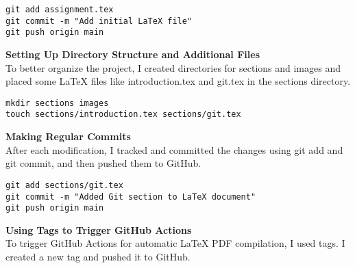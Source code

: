 \documentclass{article}
\begin{document}
\begin{verbatim}
git add assignment.tex
git commit -m "Add initial LaTeX file"
git push origin main
\end{verbatim}

\textbf{Setting Up Directory Structure and Additional Files} \\
To better organize the project, I created directories for sections and images and placed some LaTeX files like introduction.tex and git.tex in the sections directory.

\begin{verbatim}
mkdir sections images
touch sections/introduction.tex sections/git.tex
\end{verbatim}

\textbf{Making Regular Commits} \\
After each modification, I tracked and committed the changes using git add and git commit, and then pushed them to GitHub.

\begin{verbatim}
git add sections/git.tex
git commit -m "Added Git section to LaTeX document"
git push origin main
\end{verbatim}

\textbf{Using Tags to Trigger GitHub Actions} \\
To trigger GitHub Actions for automatic LaTeX PDF compilation, I used tags. I created a new tag and pushed it to GitHub.
\end{document}
